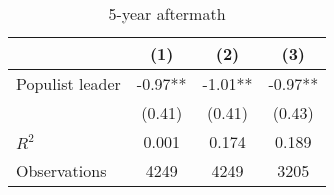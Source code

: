 \begin{table}[htbp]\centering
\def\sym#1{\ifmmode^{#1}\else\(^{#1}\)\fi}
\caption{5-year aftermath}
\begin{tabular}{l*{3}{c}}
\hline\hline
                    &\multicolumn{1}{c}{(1)}   &\multicolumn{1}{c}{(2)}   &\multicolumn{1}{c}{(3)}   \\
\hline
Populist leader     &       -0.97** &       -1.01** &       -0.97** \\
                    &      (0.41)   &      (0.41)   &      (0.43)   \\
\hline
\(R^{2}\)           &       0.001   &       0.174   &       0.189   \\
Observations        &        4249   &        4249   &        3205   \\
\hline\hline
\end{tabular}
\end{table}
